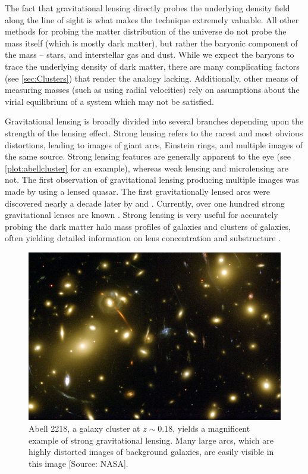 The fact that gravitational lensing directly probes the underlying density field along the line of sight is what makes the technique extremely valuable. All other methods for probing the matter distribution of the universe do not probe the mass itself (which is mostly dark matter), but rather the baryonic component of the mass -- stars, and interstellar gas and dust. While we expect the baryons to trace the underlying density of dark matter, there are many complicating factors (see \autoref{sec:Clusters}) that render the analogy lacking. Additionally, other means of measuring masses (such as using radial velocities) rely on assumptions about the virial equilibrium of a system which may not be satisfied.

Gravitational lensing is broadly divided into several branches depending upon the strength of the lensing effect. Strong lensing refers to the rarest and most obvious distortions, leading to images of giant arcs, Einstein rings, and multiple images of the same source. Strong lensing features are generally apparent to the eye (see \autoref{plot:abellcluster} for an example), whereas weak lensing and microlensing are not. The first observation of gravitational lensing producing multiple images was made by \citet{Walsh79} using a lensed quasar. The first gravitationally lensed arcs were discovered nearly a decade later by \citet{Lynds86} and \citet{Soucail87,Soucail88}. Currently, over one hundred strong gravitational lenses are known \citep{Browne03,Bolton08}. Strong lensing is very useful for accurately probing the dark matter halo mass profiles of galaxies and clusters of galaxies, often yielding detailed information on lens concentration \citep{Auger10} and substructure \citep{Mao98,Dalal02}. 

\begin{figure}
\begin{center}
\includegraphics[scale=1.5]{plots_intro/Abell2218_Med.jpg}
\caption[Strong Lensing Image]{Abell 2218, a galaxy cluster at $z \sim 0.18$, yields a magnificent example of strong gravitational lensing. Many large arcs, which are highly distorted images of background galaxies, are easily visible in this image [Source: NASA].}
\label{plot:abellcluster}
\end{center}
\end{figure}

